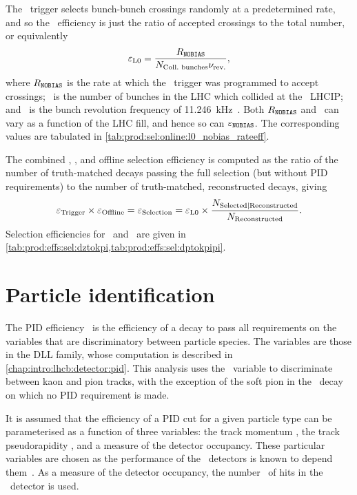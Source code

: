 The \lzero\ trigger selects bunch-bunch crossings randomly at a predetermined
rate, and so the \lzero\ efficiency is just the ratio of accepted crossings to
the total number, or equivalently
\begin{equation}
  \efflzero = \frac{%
    R_{\nobias}
  }{%
    \ncollbunches\revfreq
  },
  \label{eqn:prod:effs:sel:l0}
\end{equation}
where $R_{\texttt{NOBIAS}}$ is the rate at which the \lzero\ trigger was programmed to
accept crossings; \ncollbunches\ is the number of bunches in the \ac{LHC} which
collided at the \lhcb\ \acl{LHCIP}; and \revfreq\ is the bunch revolution
frequency of \SI{11.246}{\kilo\hertz}~\cite{Bruning:2004ej}.
Both $R_{\texttt{NOBIAS}}$ and \ncollbunches\ can vary as a function of the \ac{LHC}
fill, and hence so can $\varepsilon_{\texttt{NOBIAS}}$.
The corresponding values are tabulated in
\cref{tab:prod:sel:online:l0_nobias_rateeff}.

The combined \hltone, \hlttwo, and offline selection efficiency is computed as
the ratio of the number of truth-matched decays passing the full selection (but
without \ac{PID} requirements) to the number of truth-matched, reconstructed
decays, giving
\begin{equation}
  \efftrig \times \effoffline = \effselection = \efflzero \times \frac{%
    N_{\text{Selected}|\text{Reconstructed}}
  }{%
    N_{\text{Reconstructed}}
  }.
  \label{eqn:prod:effs:sel}
\end{equation}
Selection efficiencies for \DzToKpi\ and \DpToKpipi\ are given in
\cref{tab:prod:effs:sel:dztokpi,tab:prod:effs:sel:dptokpipi}.

\section{Particle identification}
\label{chap:prod:effs:pid}

The \ac{PID} efficiency \effpid\ is the efficiency of a decay to pass all
requirements on the variables that are discriminatory between particle species.
The variables are those in the \acf{DLL} family, whose computation is described
in \cref{chap:intro:lhcb:detector:pid}.
This analysis uses the \dllkpi\ variable to discriminate between kaon and pion
tracks, with the exception of the soft pion in the \DstToDzpi\ decay on which
no \ac{PID} requirement is made.

It is assumed that the efficiency of a \ac{PID} cut for a given particle type
can be parameterised as a function of three variables: the track momentum
\ptot, the track pseudorapidity \Eta, and a measure of the detector occupancy.
These particular variables are chosen as the performance of the \rich\
detectors is known to depend them~\cite{Adinolfi:2012qfa}.
As a measure of the detector occupancy, the number \nspd\ of hits in the \spd\
detector is used.

